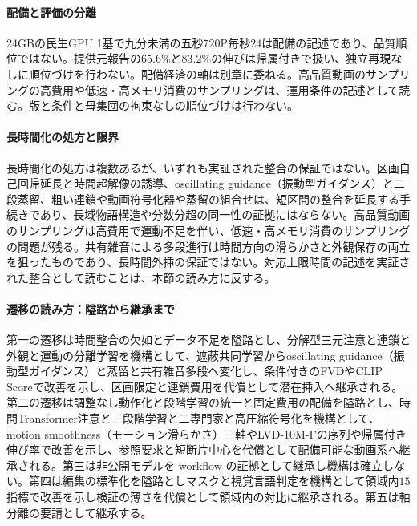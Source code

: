 \documentclass[lualatex,a4paper,10pt]{jlreq}
\begin{document}
\paragraph{配備と評価の分離}
24GBの民生GPU 1基で九分未満の五秒$720$P毎秒$24$は配備の記述であり、品質順位ではない\autocite{btd124}。提供元報告の$65.6\%$と$83.2\%$の伸びは帰属付きで扱い、独立再現なしに順位づけを行わない\autocite{btd124}。配備経済の軸は別章に委ねる\autocite{btd124}。高品質動画のサンプリングの高費用や低速・高メモリ消費のサンプリングは、運用条件の記述として読む\autocite{btd073,btd075}。版と条件と母集団の拘束なしの順位づけは行わない\autocite{btd138}。

\paragraph{長時間化の処方と限界}
長時間化の処方は複数あるが、いずれも実証された整合の保証ではない\autocite{btd070,btd071,btd073}。区画自己回帰延長と時間超解像の誘導、oscillating guidance（振動型ガイダンス）と二段蒸留、粗い連鎖や動画符号化器や蒸留の組合せは、短区間の整合を延長する手続きであり、長域物語構造や分数分超の同一性の証拠にはならない\autocite{btd070,btd071,btd073}。高品質動画のサンプリングは高費用で運動不足を伴い、低速・高メモリ消費のサンプリングの問題が残る\autocite{btd073,btd075}。共有雑音による多段進行は時間方向の滑らかさと外観保存の両立を狙ったものであり、長時間外挿の保証ではない\autocite{btd073}。対応上限時間の記述を実証された整合として読むことは、本節の読み方に反する\autocite{btd070,btd071,btd073,btd074,btd075,btd077,btd124,btd138}。

\paragraph{遷移の読み方：隘路から継承まで}
第一の遷移は時間整合の欠如とデータ不足を隘路とし、分解型三元注意と連鎖と外観と運動の分離学習を機構として、遮蔽共同学習からoscillating guidance（振動型ガイダンス）と蒸留と共有雑音多段へ変化し、条件付きのFVDやCLIP Scoreで改善を示し、区画限定と連鎖費用を代償として潜在挿入へ継承される\autocite{btd070,btd071,btd073}。第二の遷移は調整なし動作化と段階学習の統一と固定費用の配備を隘路とし、時間Transformer注意と三段階学習と二専門家と高圧縮符号化を機構として、motion smoothness（モーション滑らかさ）三軸やLVD-10M-Fの序列や帰属付き伸び率で改善を示し、参照要求と短断片中心を代償として配備可能な動画系へ継承される\autocite{btd074,btd075,btd124}。第三は非公開モデルを workflow の証拠として継承し機構は確立しない\autocite{btd077}。第四は編集の標準化を隘路としマスクと視覚言語判定を機構として領域内$15$指標で改善を示し検証の薄さを代償として領域内の対比に継承される\autocite{btd138}。第五は軸分離の要請として継承する\autocite{btd138}。
\end{document}
